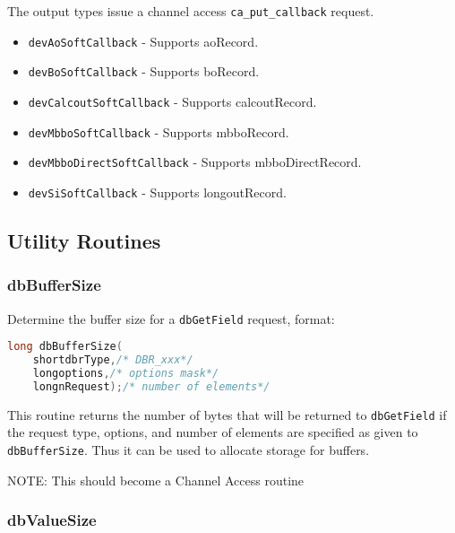 The output types issue a channel access \verb|ca_put_callback| request.

\begin{itemize}

\item \verb|devAoSoftCallback| - Supports aoRecord.

\item \verb|devBoSoftCallback| - Supports boRecord.

\item \verb|devCalcoutSoftCallback| - Supports calcoutRecord.

\item \verb|devMbboSoftCallback| - Supports mbboRecord.

\item \verb|devMbboDirectSoftCallback| - Supports mbboDirectRecord.

\item \verb|devSiSoftCallback| - Supports longoutRecord.

\end{itemize}


\subsection{Utility Routines}

\subsubsection{dbBufferSize}

Determine the buffer size for a \verb|dbGetField| request, format:

\begin{lstlisting}[language=C]
long dbBufferSize(
    shortdbrType,/* DBR_xxx*/
    longoptions,/* options mask*/
    longnRequest);/* number of elements*/
\end{lstlisting}

This routine returns the number of bytes that will be returned to \verb|dbGetField| if the request type, options, and number of elements are specified as given to \verb|dbBufferSize|.
Thus it can be used to allocate storage for buffers.

NOTE: This should become a Channel Access routine

\subsubsection{dbValueSize}

